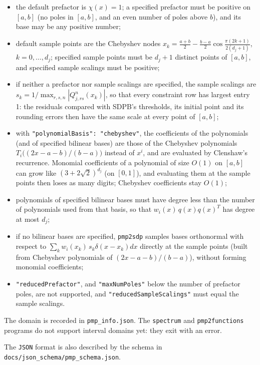 \documentclass[12pt]{article}
\numberwithin{equation}{section}
\begin{document}
\begin{itemize}
	\item the default prefactor is $\chi(x)=1$; a specified prefactor must be positive on $[a,b]$ (no poles in $[a,b]$, and an even number of poles above $b$), and its base may be any positive number;
	\item default sample points are the Chebyshev nodes $x_k=\frac{a+b}{2}-\frac{b-a}{2}\cos\frac{\pi(2k+1)}{2(d_j+1)}$, $k=0,\dots,d_j$; specified sample points must be $d_j+1$ distinct points of $[a,b]$, and specified sample scalings must be positive;
	\item if neither a prefactor nor sample scalings are specified, the sample scalings are $s_k=1/\max_{r,s,n}|Q^{n}_{j,rs}(x_k)|$, so that every constraint row has largest entry 1: the residuals compared with SDPB's thresholds, its initial point and its rounding errors then have the same scale at every point of $[a,b]$;
	\item with \texttt{"polynomialBasis": "chebyshev"}, the coefficients of the polynomials (and of specified bilinear bases) are those of the Chebyshev polynomials $T_i\big((2x-a-b)/(b-a)\big)$ instead of $x^i$, and are evaluated by Clenshaw's recurrence. Monomial coefficients of a polynomial of size $O(1)$ on $[a,b]$ can grow like $(3+2\sqrt 2)^{d_j}$ (on $[0,1]$), and evaluating them at the sample points then loses as many digits; Chebyshev coefficients stay $O(1)$;
	\item polynomials of specified bilinear bases must have degree less than the number of polynomials used from that basis, so that $w_i(x)\, q(x) q(x)^T$ has degree at most $d_j$;
	\item if no bilinear bases are specified, \texttt{pmp2sdp} samples bases orthonormal with respect to $\sum_k w_i(x_k)\, s_k \delta(x-x_k)dx$ directly at the sample points (built from Chebyshev polynomials of $(2x-a-b)/(b-a)$), without forming monomial coefficients;
	\item \texttt{"reducedPrefactor"}, and \texttt{"maxNumPoles"} below the number of prefactor poles, are not supported, and \texttt{"reducedSampleScalings"} must equal the sample scalings.
\end{itemize}
The domain is recorded in \texttt{pmp\_info.json}. The \texttt{spectrum} and \texttt{pmp2functions} programs do not support interval domains yet: they exit with an error.

The \texttt{JSON} format is also described by the schema in \texttt{docs/json\_schema/pmp\_schema.json}.
\end{document}

